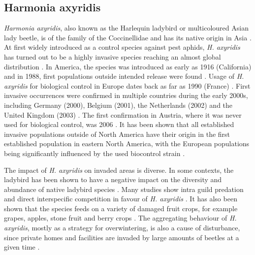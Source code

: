 \documentclass[12pt,a4paper]{article}
\begin{document}
\subsection{Harmonia axyridis}
\textit{Harmonia axyridis}, also known as the Harlequin ladybird or multicoloured Asian lady beetle, is of the family of the Coccinellidae and has its native origin in Asia \cite{roy2016harmonia}.
At first widely introduced as a control species against pest aphids, \textit{H. axyridis} has turned out to be a highly invasive species reaching an almost global distribution \cite{brown2008harmonia}.
In America, the species was introduced as early as 1916 (California) and in 1988, first populations outside intended release were found \cite{chapin1991harmonia}.
Usage of \textit{H. axyridis} for biological control in Europe dates back as far as 1990 (France) \cite{coutanceau2006harmoniaFR}.
First invasive occurrences were confirmed in multiple countries during the early 2000s, including Germany (2000), Belgium (2001), the Netherlands (2002) and the United Kingdom (2003) \cite{roy2016harmonia}.
The first confirmation in Austria, where it was never used for biological control, was 2006 \cite{rabitsch2006harmoniaAT}.  
It has been shown that all established invasive populations outside of North America have their origin in the first established population in eastern North America, with the European populations being significantly influenced by the used biocontrol strain \cite{lombaert2010harmoniabridgehead}.

The impact of \textit{H. axyridis} on invaded areas is diverse.
In some contexts, the ladybird has been shown to have a negative impact on the diversity and abundance of native ladybird species \cite{roy2016harmonia}.
Many studies show intra guild predation and direct interspecific competition in favour of \textit{H. axyridis} \cite{pell2008harmoniaIGP}.
It has also been shown that the species feeds on a variety of damaged fruit crops, for example grapes, apples, stone fruit and berry crops \cite{koch2004harmoniafoodcrop}.
The aggregating behaviour of \textit{H. axyridis}, mostly as a strategy for overwintering, is also a cause of disturbance, since private homes and facilities are invaded by large amounts of beetles at a given time \cite{nalepa2005harmoniahomes}.

\newpage
\printbibliography[]

\end{document}
